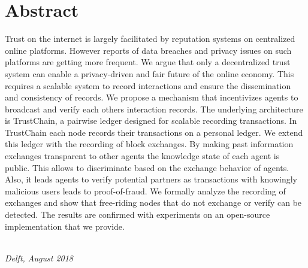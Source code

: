 \chapter*{Abstract}

Trust on the internet is largely facilitated by reputation systems on centralized online platforms. 
However reports of data breaches and privacy issues on such platforms are getting more frequent.
We argue that only a decentralized trust system can enable a privacy-driven and fair 
future of the online economy. This requires a scalable system to record interactions and ensure
the dissemination and consistency of records. We propose a mechanism that incentivizes agents to 
broadcast and verify each others interaction records. The underlying architecture is TrustChain, 
a pairwise ledger designed for scalable recording transactions. In TrustChain each node records 
their transactions on a personal ledger. We extend this ledger with the recording of block 
exchanges. By making past information exchanges transparent to other agents the knowledge state of 
each agent is public. This allows to discriminate based on the exchange behavior of agents. Also, it
leads agents to verify potential partners as transactions with knowingly malicious users leads to 
proof-of-fraud. We formally analyze the recording of exchanges and show that free-riding nodes that do
not exchange or verify can be detected. The results are confirmed with experiments on an open-source 
implementation that we provide.

\begin{flushright}
{\makeatletter\itshape
    \@author \\
    Delft, August 2018
\makeatother}
\end{flushright}

